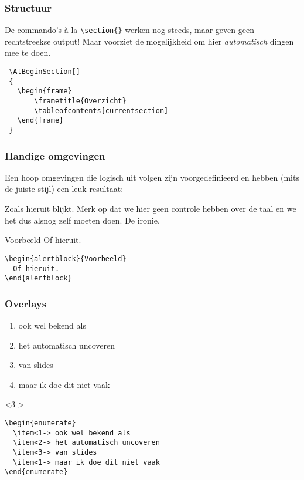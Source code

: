 \begin{frame}[fragile]
  \frametitle{Structuur}

  De commando's \`a la \texttt{\textcolor{uagreen}{\textbackslash section}\{\}} werken nog steeds, maar geven geen rechtstreekse output! Maar  voorziet de mogelijkheid om hier \emph{automatisch} dingen mee te doen.
  \begin{verbatim}
 \AtBeginSection[]
 {
   \begin{frame}
 	   \frametitle{Overzicht}
 	   \tableofcontents[currentsection]
   \end{frame}
 }
  \end{verbatim}
\end{frame}

\begin{frame}[fragile]
  \frametitle{Handige omgevingen}

  \footnotesize
  Een hoop omgevingen die logisch uit  volgen zijn voorgedefinieerd en hebben (mits de juiste stijl) een leuk resultaat:
  \begin{definition}
    Zoals hieruit blijkt. Merk op dat we hier geen controle hebben over de taal en we het dus alsnog zelf moeten doen. De ironie.
  \end{definition}

  \begin{alertblock}{Voorbeeld}
    Of hieruit.
  \end{alertblock}
  \begin{verbatim}
\begin{alertblock}{Voorbeeld}
  Of hieruit.
\end{alertblock}
  \end{verbatim}
\end{frame}

\begin{frame}[fragile]
  \frametitle{Overlays}

  \small
  \begin{enumerate}
    \item<1-> ook wel bekend als
    \item<2-> het automatisch uncoveren
    \item<3-> van slides
    \item<1-> maar ik doe dit niet vaak
  \end{enumerate}
  \begin{uncoverenv}<3->
  \begin{verbatim}
\begin{enumerate}
  \item<1-> ook wel bekend als
  \item<2-> het automatisch uncoveren
  \item<3-> van slides
  \item<1-> maar ik doe dit niet vaak
\end{enumerate}
\end{verbatim}
  \end{uncoverenv}
\end{frame}

